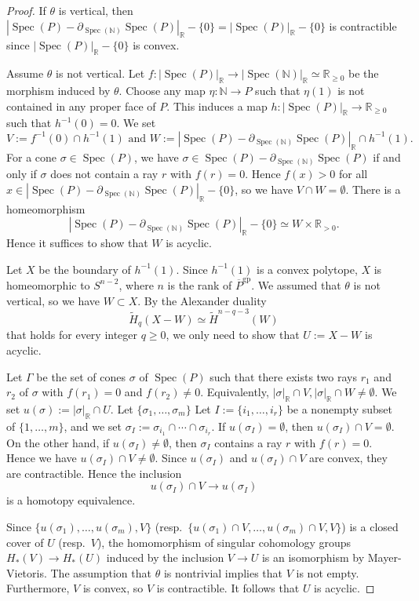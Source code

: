 \documentclass[10pt,a4paper]{amsart}
\newcommand{\N}{\mathbb{N}}
\newcommand{\R}{\mathbb{R}}
\DeclareMathOperator{\Spec}{Spec}
\newcommand{\gp}{\mathrm{gp}}
\newcommand{\ol}{\overline}
\begin{document}
\begin{proof}
If $\theta$ is vertical, then
$|\Spec(P)-\partial_{\Spec(\N)}\Spec(P)|_{\R}-\{0\}=|\Spec(P)|_{\R}-\{0\}$ is contractible since $|\Spec(P)|_{\R}-\{0\}$ is convex.

Assume $\theta$ is not vertical.
Let $f\colon |\Spec(P)|_{\R}\to |\Spec(\N)|_{\R}\simeq \R_{\geq 0}$ be the morphism induced by $\theta$.
Choose any map $\eta\colon \N\to P$ such that $\eta(1)$ is not contained in any proper face of $P$.
This induces a map $h\colon |\Spec(P)|_{\R}\to \R_{\geq 0}$ such that $h^{-1}(0)=0$.
We set
\[
V:=f^{-1}(0)\cap h^{-1}(1)
\text{ and }
W:=|\Spec(P)-\partial_{\Spec(\N)}\Spec(P)|_{\R}\cap h^{-1}(1).
\]
For a cone $\sigma\in \Spec(P)$, we have $\sigma\in \Spec(P)-\partial_{\Spec(\N)}\Spec(P)$ if and only if $\sigma$ does not contain a ray $r$ with $f(r)=0$. 
Hence $f(x)>0$ for all $x\in |\Spec(P)-\partial_{\Spec(\N)}\Spec(P)|_{\R}-\{0\}$, so we have $V\cap W=\emptyset$.
There is a homeomorphism
\[
|\Spec(P)-\partial_{\Spec(\N)}\Spec(P)|_{\R}-\{0\}
\simeq
W\times \R_{>0}.
\]
Hence it suffices to show that $W$ is acyclic.

Let $X$ be the boundary of $h^{-1}(1)$.
Since $h^{-1}(1)$ is a convex polytope, $X$ is homeomorphic to $S^{n-2}$, where $n$ is the rank of $\ol{P}^\gp$.
We assumed that $\theta$ is not vertical, so we have $W\subset X$.
By the Alexander duality
\[
\tilde{H}_q(X-W)
\simeq
\tilde{H}^{n-q-3}(W)
\]
that holds for every integer $q\geq 0$, we only need to show that $U:=X-W$ is acyclic.

Let $\Gamma$ be the set of cones $\sigma$ of $\Spec(P)$ such that there exists two rays $r_1$ and $r_2$ of $\sigma$ with $f(r_1)=0$ and $f(r_2)\neq 0$.
Equivalently, $|\sigma|_{\R}\cap V,|\sigma|_{\R}\cap W\neq \emptyset$.
We set $u(\sigma):=|\sigma|_{\R}\cap U$.
Let $\{\sigma_1,\ldots,\sigma_m\}$ Let $I:=\{i_1,\ldots,i_r\}$ be a nonempty subset of $\{1,\ldots,m\}$, and we set $\sigma_I:=\sigma_{i_1}\cap \cdots \cap \sigma_{i_r}$.
If $u(\sigma_I)=\emptyset$, then $u(\sigma_I)\cap V=\emptyset$.
On the other hand, if $u(\sigma_I)\neq \emptyset$, then $\sigma_I$ contains a ray $r$ with $f(r)=0$.
Hence we have $u(\sigma_I)\cap V\neq \emptyset$.
Since $u(\sigma_I)$ and $u(\sigma_I)\cap V$ are convex, they are contractible.
Hence the inclusion
\[
u(\sigma_I)\cap V
\to
u(\sigma_I)
\]
is a homotopy equivalence.

Since 
$\{u(\sigma_1),\ldots,u(\sigma_m),V\}$ (resp.\ $\{u(\sigma_1)\cap V,\ldots,u(\sigma_m)\cap V,V\}$) is a closed cover of $U$ (resp.\ $V$), the homomorphism of singular cohomology groups $H_*(V)\to H_*(U)$ induced by the inclusion $V\to U$ is an isomorphism by 
Mayer-Vietoris.
The assumption that $\theta$ is nontrivial implies that $V$ is not empty.
Furthermore, $V$ is convex, so $V$ is contractible.
It follows that $U$ is acyclic.
\end{proof}
\end{document}

